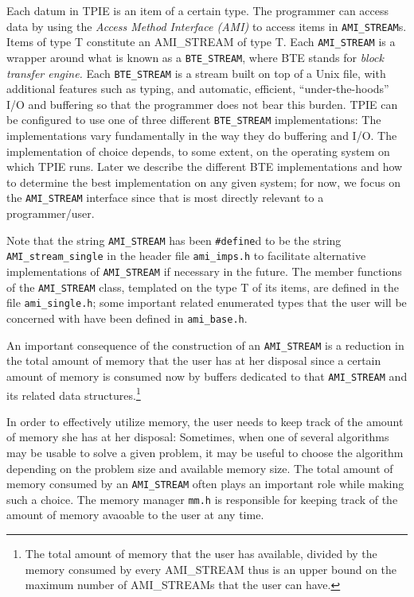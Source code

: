 Each datum in TPIE is an item of a certain type.
The programmer can access data by using the
\emph{Access Method Interface (AMI)} to access items in 
\verb|AMI_STREAM|s. Items of type T constitute an AMI\_STREAM of 
type T. Each \verb|AMI_STREAM| is a wrapper around  what is known
as a \verb|BTE_STREAM|, where BTE stands for \emph{block transfer
engine.} Each \verb|BTE_STREAM| is a stream built on top of a Unix file, with 
additional features such as typing,  and automatic, efficient,
``under-the-hoods'' I/O and buffering so that the programmer does
not bear this burden. TPIE can be configured to use one of three
different \verb|BTE_STREAM| implementations: The implementations vary
fundamentally in the way they do buffering and I/O. The implementation
of choice depends, to some extent, on the operating system on which 
TPIE runs. Later we describe the different BTE implementations and
how to determine the best implementation on any given system; for now,
we focus on the \verb|AMI_STREAM| interface since that is most directly
relevant to a programmer/user.


Note that the string \verb|AMI_STREAM| has
 been \verb|#define|d to be the string \verb|AMI_stream_single| in the
 header file \verb|ami_imps.h| to facilitate alternative implementations
of \verb|AMI_STREAM| if necessary in the future.
The member functions of the \verb|AMI_STREAM| class,
templated on the type T of its items,  are defined in the file \verb|ami_single.h|;
some important related enumerated types that the user will be
 concerned with have been defined in \verb|ami_base.h|.


An important consequence of the construction of an \verb|AMI_STREAM| is a
reduction in the total amount of memory that the user has at her
disposal since a certain amount of memory is consumed now by buffers
dedicated to that \verb|AMI_STREAM| and its related data
structures.\footnote{The total amount of memory that the user has
available, divided by the memory consumed by every AMI\_STREAM thus
is an upper bound on the maximum number of AMI\_STREAMs that the user
can have.}
 
In order to effectively utilize memory, the user needs to keep track
of the amount of memory she has at her disposal: Sometimes, 
when one of several algorithms may be usable to solve a given problem,
it may be useful to choose the algorithm depending on the problem
size and available memory size. The total amount of memory consumed
by an \verb|AMI_STREAM| often plays an important role while making such 
a choice. The memory manager \verb|mm.h| is responsible for keeping
track of the amount of memory avaoable to the user at any time.

